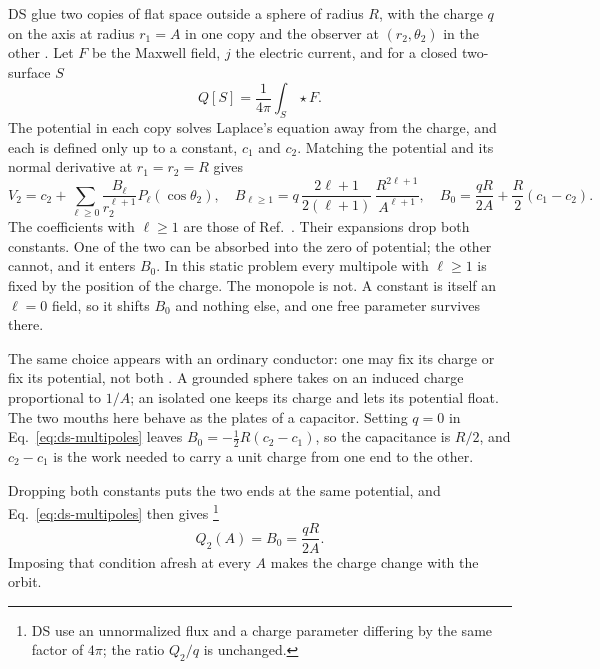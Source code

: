 \documentclass[aps,prd,10pt,onecolumn,nofootinbib,superscriptaddress,floatfix]{revtex4-2}
\begin{document}
DS glue two copies of flat space outside a sphere of radius $R$, with the
charge $q$ on the axis at radius $r_1=A$ in one copy and the observer at
$(r_2,\theta_2)$ in the other \cite{DaiStojkovic2019Observing}.  Let $F$ be
the Maxwell field, $j$ the electric current, and for a closed two-surface $S$
\begin{equation}
  Q[S]=\frac{1}{4\pi}\int_S\star F.
  \label{eq:maxwell-charge}
\end{equation}
The potential in each copy solves Laplace's equation away from the charge,
and each is defined only up to a constant, $c_1$ and $c_2$.  Matching the potential and its normal
derivative at $r_1=r_2=R$ gives
\begin{equation}
  V_2=c_2+\sum_{\ell\ge0}\frac{B_\ell}{r_2^{\ell+1}}P_\ell(\cos\theta_2),
  \quad
  B_{\ell\ge1}=q\,\frac{2\ell+1}{2(\ell+1)}\,\frac{R^{2\ell+1}}{A^{\ell+1}},
  \quad
  B_0=\frac{qR}{2A}+\frac{R}{2}(c_1-c_2).
  \label{eq:ds-multipoles}
\end{equation}
The coefficients with $\ell\ge1$ are those of
Ref.~\cite{DaiStojkovic2019Observing}.  Their expansions drop both constants.
One of the two can be absorbed into the zero of potential; the other cannot,
and it enters $B_0$.
In this static problem every multipole with $\ell\ge1$ is fixed by the position
of the charge.  The monopole is not.  A constant is itself an $\ell=0$ field, so
it shifts $B_0$ and nothing else, and one free parameter survives there.

The same choice appears with an ordinary conductor: one may fix its charge or
fix its potential, not both \cite[Ch.~2]{JacksonClassicalElectrodynamics}.  A
grounded sphere takes on an induced charge proportional to $1/A$; an isolated
one keeps its charge and lets its potential float.  The two mouths here behave
as the plates of a capacitor.  Setting $q=0$ in Eq.~\eqref{eq:ds-multipoles}
leaves $B_0=-\tfrac12R(c_2-c_1)$, so the capacitance is $R/2$, and $c_2-c_1$ is
the work needed to carry a unit charge from one end to the other.

Dropping both constants puts the two ends at the same potential, and
Eq.~\eqref{eq:ds-multipoles} then gives%
\footnote{DS use an unnormalized flux and a charge parameter differing by the
same factor of $4\pi$; the ratio $Q_2/q$ is unchanged.}
\begin{equation}
  Q_2(A)=B_0=\frac{qR}{2A}.
  \label{eq:ds-electric}
\end{equation}
Imposing that condition afresh at every $A$ makes the charge change with the
orbit.
\end{document}
